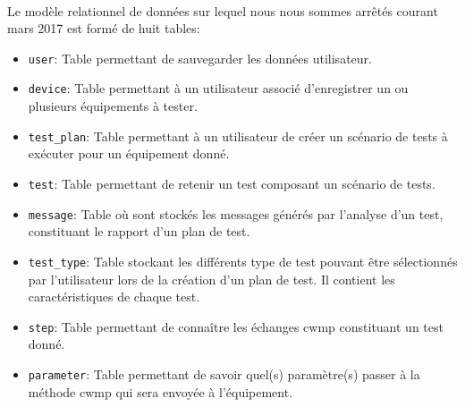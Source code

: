 \documentclass[12pt,a4paper]{report}
\begin{document}
\paragraph*{}Le modèle relationnel de données sur lequel nous nous sommes arrêtés courant mars 2017 est formé de huit tables:
\begin{itemize}
\item \texttt{user}: Table permettant de sauvegarder les données utilisateur.
\item \texttt{device}: Table permettant à un utilisateur associé d'enregistrer un ou plusieurs équipements à tester.
\item \texttt{test\_plan}: Table permettant à un utilisateur de créer un scénario de tests à exécuter pour un équipement donné.
\item \texttt{test}: Table permettant de retenir un test composant un scénario de tests.
\item \texttt{message}: Table où sont stockés les messages générés par l'analyse d'un test, constituant le rapport d'un plan de test.
\item \texttt{test\_type}: Table stockant les différents type de test pouvant être sélectionnés par l'utilisateur lors de la création d'un plan de test. Il contient les caractéristiques de chaque test.
\item \texttt{step}: Table permettant de connaître les échanges \gls{cwmp} constituant un test donné. 
\item \texttt{parameter}: Table permettant de savoir quel(s) paramètre(s) passer à la méthode \gls{cwmp} qui sera envoyée à l'équipement.
\end{itemize}
\end{document}
